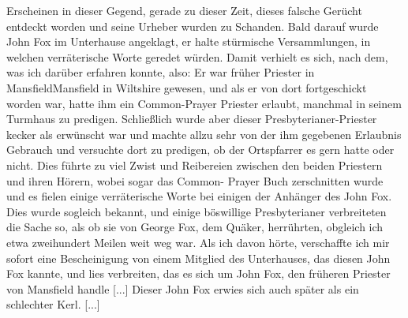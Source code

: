 Erscheinen in dieser Gegend, gerade zu dieser Zeit, dieses falsche
Gerücht entdeckt worden und seine Urheber wurden zu Schanden.
Bald darauf wurde John Fox im Unterhause angeklagt, er
halte stürmische Versammlungen, in welchen verräterische Worte
geredet würden. Damit verhielt es sich, nach dem, was ich darüber
erfahren konnte, also: Er war früher Priester in Mansfield\index{}Mansfield in
Wiltshire gewesen, und als er von dort fortgeschickt worden war,
hatte ihm ein Common-Prayer Priester erlaubt, manchmal in
seinem Turmhaus zu predigen. Schließlich wurde aber dieser
Presbyterianer-Priester kecker als erwünscht war und machte
allzu sehr von der ihm gegebenen Erlaubnis Gebrauch und 
versuchte dort zu predigen, ob der Ortspfarrer es gern hatte oder
nicht. Dies führte zu viel Zwist und Reibereien zwischen den
beiden Priestern und ihren Hörern, wobei sogar das Common-
Prayer Buch zerschnitten wurde und es fielen einige verräterische
Worte bei einigen der Anhänger des John Fox. Dies wurde
sogleich bekannt, und einige böswillige Presbyterianer verbreiteten
die Sache so, als ob sie von George Fox, dem Quäker, herrührten,
obgleich ich etwa zweihundert Meilen weit weg war. Als ich
davon hörte, verschaffte ich mir sofort eine Bescheinigung von
einem Mitglied des Unterhauses, das diesen John Fox kannte,
und lies verbreiten, das es sich um John Fox, den früheren
Priester von Mansfield handle [...] Dieser John Fox erwies
sich auch später als ein schlechter Kerl. [...]

